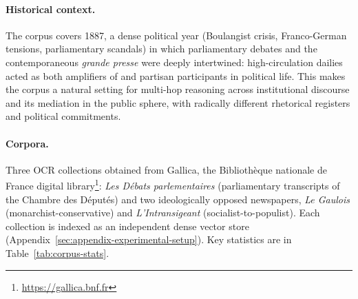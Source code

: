 
\paragraph{Historical context.}
The corpus covers 1887, a dense political year (Boulangist crisis,
Franco-German tensions, parliamentary scandals) in which parliamentary
debates and the contemporaneous \textit{grande presse} were deeply
intertwined: high-circulation dailies acted as both amplifiers of and
partisan participants in political life. This makes the corpus a natural
setting for multi-hop reasoning across institutional discourse and its
mediation in the public sphere, with radically different rhetorical
registers and political commitments.

\paragraph{Corpora.}
Three OCR collections obtained from Gallica, the Biblioth{\`e}que
nationale de France digital library\footnote{\url{https://gallica.bnf.fr}}:
\textit{Les Débats parlementaires} (parliamentary transcripts of the
Chambre des Députés) and two ideologically opposed newspapers,
\textit{Le Gaulois} (monarchist-conservative) and \textit{L'Intransigeant}
(socialist-to-populist). Each collection is indexed as an independent
dense vector store (Appendix~\ref{sec:appendix-experimental-setup}). Key
statistics are in Table~\ref{tab:corpus-stats}.

\begin{table}[htbp]
\centering
\small
{}
\caption{Corpus statistics. \textit{Les Débats} is reported both raw and
after filtering out non-debate sections (agendas, vote lists).}
\label{tab:corpus-stats}
\end{table}

